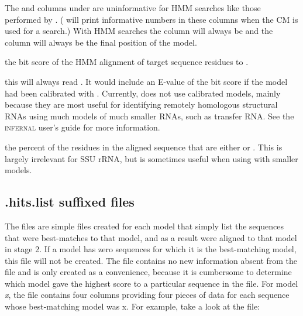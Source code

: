 The  and  columns under  are
uninformative for HMM searches like those performed by
. ( will print informative numbers in
these columns when the CM is used for a search.) With HMM searches the
 column will always be  and the  column
will always be the final position of the model.

\begin{wideitem}

\item[\emprog{bit sc}] the bit score of the HMM alignment of
  target sequence residues  to .

\item[\emprog{E-value}] this will always read \prog{-}. It would
  include an E-value of the bit score if the model had been calibrated
  with . Currently,  does not use
  calibrated models, mainly because they are most useful for
  identifying remotely homologous structural RNAs using much models of
  much smaller RNAs, such as transfer RNA. See the \textsc{infernal}
  user's guide for more information.

\item[\emprog{GC\%}] the percent of the residues in the aligned
  sequence that are either  or . This is largely
  irrelevant for SSU rRNA, but is sometimes useful when using
   with smaller models.
\end{wideitem}

\subsection{.hits.list suffixed files}

The  files are simple files created for each model
that simply list the sequences that were best-matches to that model,
and as a result were aligned to that model in stage 2. If a model has
zero sequences for which it is the best-matching model, this file will
not be created. The file contains no new information absent from 
the  file and is only created as a convenience, because it
is cumbersome to determine which model gave the highest score to a
particular sequence in the  file.  
For model \emph{x}, the
 file contains four columns providing four pieces of
data for each sequence whose best-matching model was {x}. For example,
take a look at the  file:

